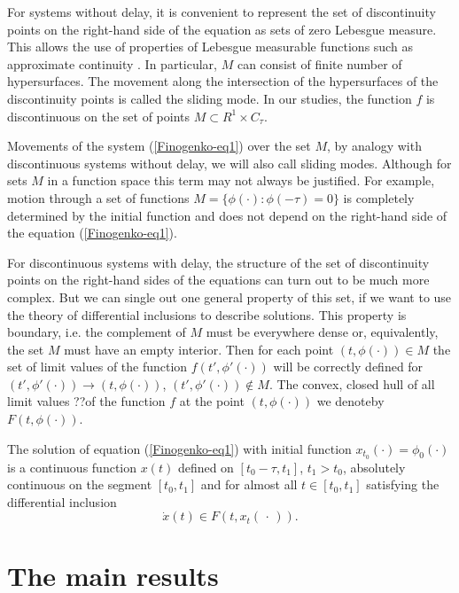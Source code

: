 \documentclass[12pt]{llncs}
\begin{document}
For systems without delay, it is convenient to represent the set of discontinuity points on the right-hand side of the equation as sets of zero Lebesgue measure. This allows the use of properties of Lebesgue measurable functions such as approximate continuity
\cite{Finogenko-second}.
In particular, $M$ can consist of
finite number of hypersurfaces. The movement along the intersection of the hypersurfaces of the discontinuity points is called the sliding mode. In our studies, the function $f$ is discontinuous on the set of points $M\subset R^{1}\times C_{\tau}$.

Movements of the system
(\ref{Finogenko-eq1})
over the set $M$, by analogy with discontinuous systems without delay, we will also call sliding modes. Although for sets $M$ in a function space this term may not always be justified. For example, motion through a set of functions $M=\{\phi(\cdot):\phi(-\tau)=0\}$ is completely determined by the initial function and does not depend on the right-hand side of the equation
(\ref{Finogenko-eq1}).

For discontinuous systems with delay, the structure of the set of discontinuity points on the right-hand sides of the equations can turn out to be much more complex. But we can single out one general property of  this set,  if we want to use  the theory of differential inclusions to describe solutions.  This property is boundary, i.e. the complement of $M$ must be everywhere
dense or, equivalently, the set $M$ must have an empty interior. 
Then for each point $(t,\phi(\cdot))\in M$ the set of limit values of the function $f(t',\phi'(\cdot))$ will be correctly defined for $(t', \phi'(\cdot))\rightarrow (t,\phi(\cdot))$, $(t',\phi'(\cdot))\not\in M$.
The convex, closed hull of all limit values ??of the function $f$ at the point
 $(t,\phi(\cdot))$ we denoteby $F(t,\phi(\cdot))$.
 
 The solution of equation
 (\ref{Finogenko-eq1})
 with initial function $x_{t_{0}}(\cdot)=\phi_{0}(\cdot)$
 is a continuous function $x(t)$ defined on 
 $[t_{0}-\tau,t_{1}]$, ${t_{1}>t_{0}}$, absolutely continuous on the segment $[t_{0},t_{1}]$
 and for almost all $t\in [t_{0},t_{1}]$ satisfying the differential inclusion
 \begin{equation}
 	\label{Finogenko-eq2}
 	\dot{x}(t)\in F(t,x_{t}(\,\cdot\,)).
 \end{equation}

\section{The main results}
\end{document}
